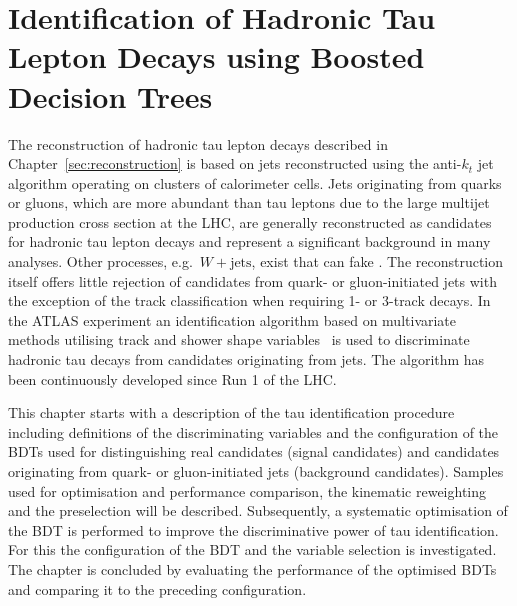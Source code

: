 \chapter{Identification of Hadronic Tau Lepton Decays using Boosted Decision
  Trees}
\label{sec:bdt}
The reconstruction of hadronic tau lepton decays described in
Chapter~\ref{sec:reconstruction} is based on jets reconstructed using the
anti-$k_t$ jet algorithm operating on clusters of calorimeter cells. Jets
originating from quarks or gluons, which are more abundant than tau leptons due
to the large multijet production cross section at the LHC, are generally
reconstructed as candidates for hadronic tau lepton decays and represent a
significant background in many analyses. Other processes, e.g.\
$W{+}\text{jets}$, exist that can fake \tauhadvis. The reconstruction itself
offers little rejection of \tauhadvis candidates from quark- or gluon-initiated
jets with the exception of the track classification when requiring 1- or 3-track
decays. In the ATLAS experiment an identification algorithm based on
multivariate methods utilising track and shower shape
variables~\cite{atlas:taurec:run1, atlas:taurec:run2} is used to discriminate
hadronic tau decays from \tauhadvis candidates originating from jets. The
algorithm has been continuously developed since Run 1 of the LHC.

This chapter starts with a description of the tau identification procedure
including definitions of the discriminating variables and the configuration of
the BDTs used for distinguishing real \tauhadvis candidates (signal candidates)
and \tauhadvis candidates originating from quark- or gluon-initiated jets
(background candidates). Samples used for optimisation and performance
comparison, the kinematic reweighting and the preselection will be described.
Subsequently, a systematic optimisation of the BDT is performed to improve the
discriminative power of tau identification. For this the configuration of the
BDT and the variable selection is investigated. The chapter is concluded by
evaluating the performance of the optimised BDTs and comparing it to the
preceding configuration.

